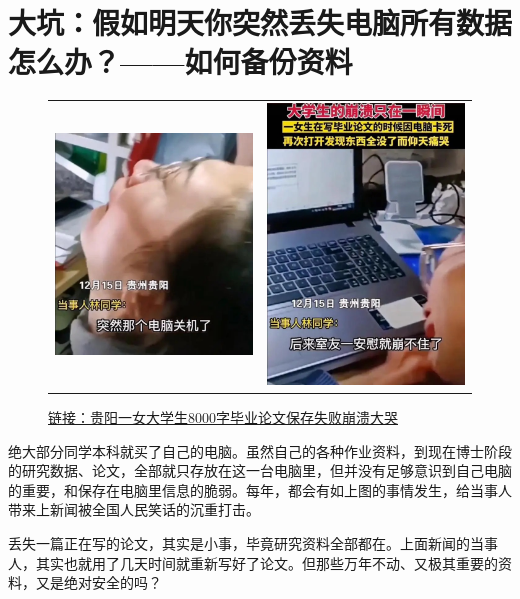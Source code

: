 \section{大坑：假如明天你突然丢失电脑所有数据怎么办？——如何备份资料}

\begin{figure}[H]
    \begin{tabular}{rl}
        \includegraphics[width=0.5\columnwidth]{author-folder/Kai.Wu/backup1.png} &
        \includegraphics[width=0.4\columnwidth]{author-folder/Kai.Wu/backup2.png}
    \end{tabular}
    \caption{\href{https://baijiahao.baidu.com/s?id=1719578217211021768}{链接：贵阳一女大学生8000字毕业论文保存失败崩溃大哭}}
\end{figure}

绝大部分同学本科就买了自己的电脑。虽然自己的各种作业资料，到现在博士阶段的研究数据、论文，全部就只存放在这一台电脑里，但并没有足够意识到自己电脑的重要，和保存在电脑里信息的脆弱。每年，都会有如上图的事情发生，给当事人带来上新闻被全国人民笑话的沉重打击。

丢失一篇正在写的论文，其实是小事，毕竟研究资料全部都在。上面新闻的当事人，其实也就用了几天时间就重新写好了论文。但那些万年不动、又极其重要的资料，又是绝对安全的吗？

